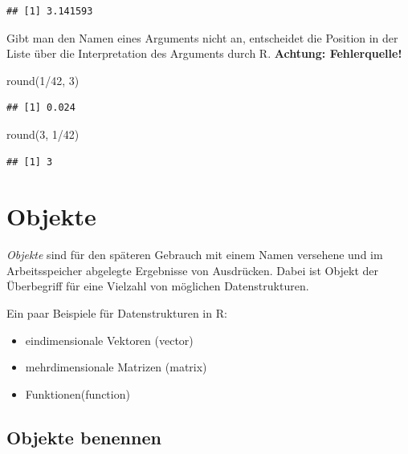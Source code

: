 \documentclass[
]{book}
\newenvironment{Shaded}{\begin{snugshade}}{\end{snugshade}}
\newcommand{\DecValTok}[1]{\textcolor[rgb]{0.00,0.00,0.81}{#1}}
\newcommand{\FunctionTok}[1]{\textcolor[rgb]{0.00,0.00,0.00}{#1}}
\newcommand{\NormalTok}[1]{#1}
\newcommand{\SpecialCharTok}[1]{\textcolor[rgb]{0.00,0.00,0.00}{#1}}
\providecommand{\tightlist}{%
  \setlength{\itemsep}{0pt}\setlength{\parskip}{0pt}}
\begin{document}
\begin{verbatim}
## [1] 3.141593
\end{verbatim}

Gibt man den Namen eines Arguments nicht an, entscheidet die Position in der Liste über die Interpretation des Arguments durch R. \textbf{Achtung: Fehlerquelle!}
\scriptsize

\begin{Shaded}
\begin{Highlighting}[]
\FunctionTok{round}\NormalTok{(}\DecValTok{1}\SpecialCharTok{/}\DecValTok{42}\NormalTok{, }\DecValTok{3}\NormalTok{)}
\end{Highlighting}
\end{Shaded}

\begin{verbatim}
## [1] 0.024
\end{verbatim}

\begin{Shaded}
\begin{Highlighting}[]
\FunctionTok{round}\NormalTok{(}\DecValTok{3}\NormalTok{, }\DecValTok{1}\SpecialCharTok{/}\DecValTok{42}\NormalTok{)}
\end{Highlighting}
\end{Shaded}

\begin{verbatim}
## [1] 3
\end{verbatim}

\hypertarget{objekte}{%
\section{Objekte}\label{objekte}}

\emph{Objekte} sind für den späteren Gebrauch mit einem Namen versehene und im Arbeitsspeicher abgelegte Ergebnisse von Ausdrücken.
Dabei ist Objekt der Überbegriff für eine Vielzahl von möglichen Datenstrukturen.

Ein paar Beispiele für Datenstrukturen in R:

\begin{itemize}
\tightlist
\item
  eindimensionale Vektoren (vector)
\item
  mehrdimensionale Matrizen (matrix)
\item
  Funktionen(function)
\end{itemize}

\hypertarget{objekte-benennen}{%
\subsection*{Objekte benennen}\label{objekte-benennen}}
\end{document}
